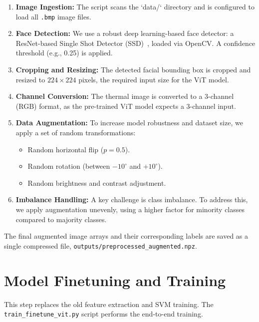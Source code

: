 \documentclass[12pt,a4paper]{report}
\begin{document}
\begin{enumerate}
    \item \textbf{Image Ingestion:} The script scans the `data/` directory and is configured to load all \texttt{.bmp} image files.
    \item \textbf{Face Detection:} We use a robust deep learning-based face detector: a ResNet-based Single Shot Detector (SSD)~\cite{ssd_detector}, loaded via OpenCV. A confidence threshold (e.g., 0.25) is applied.
    \item \textbf{Cropping and Resizing:} The detected facial bounding box is cropped and resized to $224 \times 224$ pixels, the required input size for the ViT model.
    \item \textbf{Channel Conversion:} The thermal image is converted to a 3-channel (RGB) format, as the pre-trained ViT model expects a 3-channel input.
    \item \textbf{Data Augmentation:} To increase model robustness and dataset size, we apply a set of random transformations:
        \begin{itemize}
            \item Random horizontal flip (\(p = 0.5\)).
            \item Random rotation (between \(-10^{\circ}\) and \(+10^{\circ}\)).
            \item Random brightness and contrast adjustment.
        \end{itemize}
    \item \textbf{Imbalance Handling:} A key challenge is class imbalance. To address this, we apply augmentation unevenly, using a higher factor for minority classes compared to majority classes.
\end{enumerate}

The final augmented image arrays and their corresponding labels are saved as a single compressed file, \texttt{outputs/preprocessed\_augmented.npz}.

\section{Model Finetuning and Training}
This step replaces the old feature extraction and SVM training. The \texttt{train\_finetune\_vit.py} script performs the end-to-end training.
\end{document}
